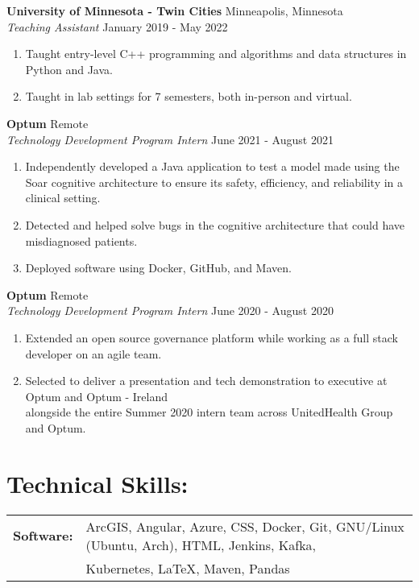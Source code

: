 \documentclass[10pt]{article}
\begin{document}
		\noindent
		\textbf{University of Minnesota - Twin Cities} \hfill Minneapolis, Minnesota \\
		\textit{Teaching Assistant} \hfill January 2019 - May 2022 
		\begin{enumerate}[label=--]
			\item Taught entry-level C++ programming and algorithms and data structures in Python and Java.
			\item Taught in lab settings for 7 semesters, both in-person and virtual.
		\end{enumerate}
		
		\noindent
		\textbf{Optum} \hfill Remote \\
		\textit{Technology Development Program Intern} \hfill June 2021 - August 2021
		\begin{enumerate}[label=--]
			\item Independently developed a Java application to test a model made using the Soar cognitive architecture to ensure its safety, efficiency, and reliability in a clinical setting.
			\item Detected and helped solve bugs in the cognitive architecture that could have misdiagnosed patients.
			\item Deployed software using Docker, GitHub, and Maven.
		\end{enumerate}		
		
		\noindent
		\textbf{Optum} \hfill Remote \\
		\textit{Technology Development Program Intern} \hfill June 2020 - August 2020
		\begin{enumerate}[label=--]
			\item Extended an open source governance platform while working as a full stack developer on an agile team.
			\item Selected to deliver a presentation and tech demonstration to executive at Optum and Optum - Ireland \\ alongside the entire Summer 2020 intern team across UnitedHealth Group and Optum.
		\end{enumerate}
		
	\section*{Technical Skills: \hrulefill}
		\begin{tabular}{@{}l@{\ }l}
		\textbf{Software: } & ArcGIS, Angular, Azure, CSS, Docker, Git, GNU/Linux (Ubuntu, Arch), HTML, Jenkins, Kafka, \\ & Kubernetes, \LaTeX, Maven, Pandas
		\end{tabular}
		
\end{document}
